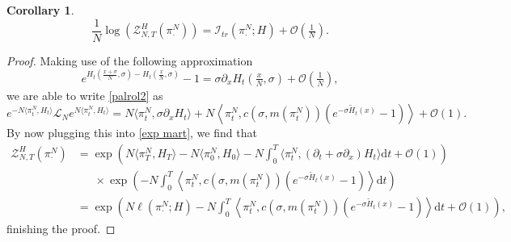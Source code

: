 \documentclass[11pt]{article}
\numberwithin{equation}{section}
\theoremstyle{definition}
\theoremstyle{plain}
\newtheorem{Corollary}[Theorem]{Corollary}
\newcommand{\dd}{\mathrm{d}}
\newcommand{\nn}{\nonumber}
\begin{document}
\begin{Corollary}\label{radon good}
    \begin{equation}
        \frac{1}{N} \log \left(\mathcal{Z}_{N,T}^H(\pi^N_{\cdot}) \right)
        =  \mathcal{I}_{tr}(\pi^N_{\cdot};H)+ \mathcal{O}(\tfrac{1}{N}) .
    \end{equation}
\end{Corollary}
\begin{proof}
Making use of the following approximation
    \begin{equation}
        e^{H_t(\frac{x+\sigma}{N},\sigma) - H_t(\frac{x}{N},\sigma)}  -1 = \sigma \partial_xH_t(\tfrac{x}{N},\sigma) + \mathcal{O}(\tfrac{1}{N}),
    \end{equation}
we are able to write \eqref{palrol2} as
    \begin{equation}\label{hamiltonian}
        e^{-N\langle \pi^N_{t}, H_t\rangle}\mathscr{L}_Ne^{N\langle \pi^N_{t}, H_t\rangle} = N\langle \pi^N_{t}, \sigma \partial_xH_t\rangle  + N \left\langle \pi^N_{t}, c(\sigma, m(\pi^N_{t})) \left(e^{-\sigma \widetilde{H}_t(x)} -1\right)\right\rangle + \mathcal{O}(1). 
    \end{equation}
By now plugging this into \eqref{exp mart}, we find that 
    \begin{align}
        \mathcal{Z}_{N,T}^H(\pi^N_{\cdot}) 
        &\nn=\exp \left( N\langle \pi^N_{T}, H_T\rangle  - N\langle \pi^N_{0}, H_0\rangle - N\int_0^T \langle \pi^N_{t}, (\partial_t +\sigma \partial_x)H_t\rangle  \dd t + \mathcal{O}(1)\right)\\
        \nn&\ \ \ \ \ \ \ \times \exp\left( - N\int_0^T \left\langle \pi^N_{t}, c(\sigma, m(\pi^N_{t})) \left(e^{-\sigma \widetilde{H}_t(x)} -1\right)\right\rangle\dd t \right)\\
        &= \exp\left( N\ell(\pi^N_{\cdot};H) - N\int_0^T \left\langle \pi^N_{t}, c(\sigma, m(\pi^N_{t})) \left(e^{-\sigma \widetilde{H}_t(x)} -1\right)\right\rangle \dd t+ \mathcal{O}(1) \right),
    \end{align}
finishing the proof.
\end{proof}
\end{document}
